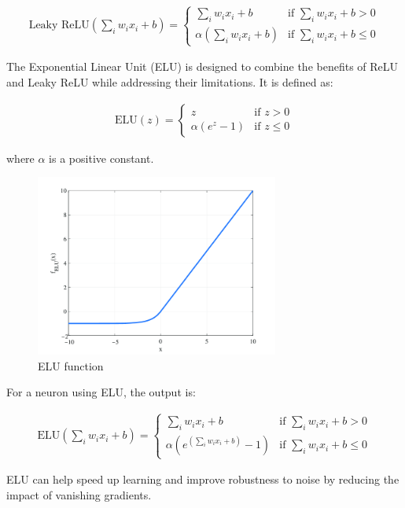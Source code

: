 \begin{align}
  \text{Leaky ReLU}(\sum_i w_i x_i + b) = \begin{cases}
    \sum_i w_i x_i + b & \text{if } \sum_i w_i x_i + b > 0 \\
    \alpha (\sum_i w_i x_i + b) & \text{if } \sum_i w_i x_i + b \leq 0
  \end{cases}
\end{align}

The Exponential Linear Unit (ELU) is designed to combine the benefits of ReLU and Leaky ReLU while addressing their limitations.
It is defined as:

\begin{align}
  \text{ELU}(z) = \begin{cases}
    z & \text{if } z > 0 \\
    \alpha (e^z - 1) & \text{if } z \leq 0
  \end{cases}
\end{align}

where \( \alpha \) is a positive constant.

\begin{figure}[H]
  \centering
  \includegraphics[width=80mm]{figures/elu.png}
  \caption{ELU function}
  \label{elu}
\end{figure}
For a neuron using ELU, the output is:

\begin{align}
  \text{ELU}(\sum_i w_i x_i + b) = \begin{cases}
    \sum_i w_i x_i + b & \text{if } \sum_i w_i x_i + b > 0 \\
    \alpha (e^{(\sum_i w_i x_i + b)} - 1) & \text{if } \sum_i w_i x_i + b \leq 0
  \end{cases}
\end{align}

ELU can help speed up learning and improve robustness to noise by reducing the impact of vanishing gradients.

